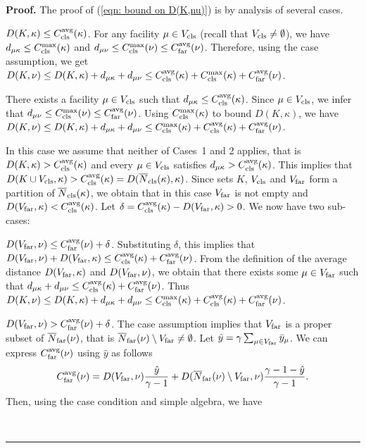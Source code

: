 \documentclass[oneside,final]{ucr}
\newenvironment{proof}[1][Proof]{\textbf{#1.} }{\ \rule{0.5em}{0.5em}}
\begin{document}
\begin{proof}
The proof of (\ref{eqn: bound on D(K,nu)}) is by analysis of several cases.
%

\medskip
\noindent
{} $D(K, \kappa) \leq \clsdist(\kappa)$. For any
facility $\mu \in V_{\cls}$ (recall that $V_{\cls}\neq\emptyset$), 
we have $d_{\mu\kappa} \leq \clsmax(\kappa)$ 
and $d_{\mu\nu} \leq \clsmax(\nu) \leq \fardist(\nu)$. Therefore, using the
case assumption, we get
	$D(K,\nu) \leq D(K,\kappa) + d_{\mu\kappa} + d_{\mu\nu} 
				\leq \clsdist(\kappa) + \clsmax(\kappa) + \fardist(\nu)$.

\medskip
\noindent
{} There exists a facility $\mu\in V_{\cls}$ such that
  $d_{\mu\kappa} \leq \clsdist(\kappa)$. Since $\mu\in V_{\cls}$, we infer
  that $d_{\mu\nu} \leq \clsmax(\nu) \leq \fardist(\nu)$.  Using
  $\clsmax(\kappa)$ to bound $D(K, \kappa)$, we have $D(K, \nu)
  \leq D(K, \kappa) + d_{\mu\kappa} + d_{\mu\nu} \leq
  \clsmax(\kappa) + \clsdist(\kappa) + \fardist(\nu)$.

\medskip
\noindent
{} In this case we assume that neither of Cases~1 and 2 applies, that is
 $D(K, \kappa) > \clsdist(\kappa)$ and every $\mu \in V_{\cls}$ satisfies
 $d_{\mu\kappa} >  \clsdist(\kappa)$. This implies that
$D(K\cup V_{\cls}, \kappa) > \clsdist(\kappa) = D(\wbarclsnb(\kappa), \kappa)$.
Since sets $K$, $V_{\cls}$ and $V_{\far}$ form a partition of $\wbarclsnb(\kappa)$,
we obtain that in this case $V_{\far}$ is not
empty and $D(V_{\far}, \kappa) < \clsdist(\kappa)$. 
Let $\delta = \clsdist(\kappa) - D(V_{\far}, \kappa) > 0$. 
We now have two sub-cases:
%
\begin{description}
	
\item{} {$D(V_{\far}, \nu) \leq \fardist(\nu) + \delta$}.
  Substituting $\delta$, this implies that $D(V_{\far}, \nu) +
  D(V_{\far},\kappa) \le \clsdist(\kappa) + \fardist(\nu)$.  From the
  definition of the average distance $D(V_{\far},\kappa)$ and
  $D(V_{\far}, \nu)$, we obtain that there exists some $\mu \in
  V_{\far}$ such that $d_{\mu\kappa} + d_{\mu\nu} \leq
  \clsdist(\kappa) + \fardist(\nu)$.  Thus $D(K, \nu) \leq D(K,
  \kappa) + d_{\mu\kappa} + d_{\mu\nu} \leq \clsmax(\kappa) +
  \clsdist(\kappa) + \fardist(\nu)$.

\item{} {$D(V_{\far}, \nu) > \fardist(\nu) + \delta$}.
  The case assumption implies that $V_{\far}$ is a proper subset of
  $\wbarfarnb(\nu)$, that is $\wbarfarnb(\nu) \setminus V_{\far}
  \neq\emptyset$.  Let $\hat{y} = \gamma \sum_{\mu\in V_{\smallfar}}
  \bary_{\mu}$.  We can express $\fardist(\nu)$ using $\hat{y}$ as
  follows
%
\begin{equation*}
\fardist(\nu) = D(V_{\far},\nu) \frac{\hat{y}}{\gamma-1} +
    D(\wbarfarnb(\nu)\setminus V_{\far}, \nu) \frac{\gamma-1-\hat{y}}{\gamma-1}.
\end{equation*}
%
Then, using the case condition and simple algebra, we have


\end{description}
\end{proof}
\end{document}
